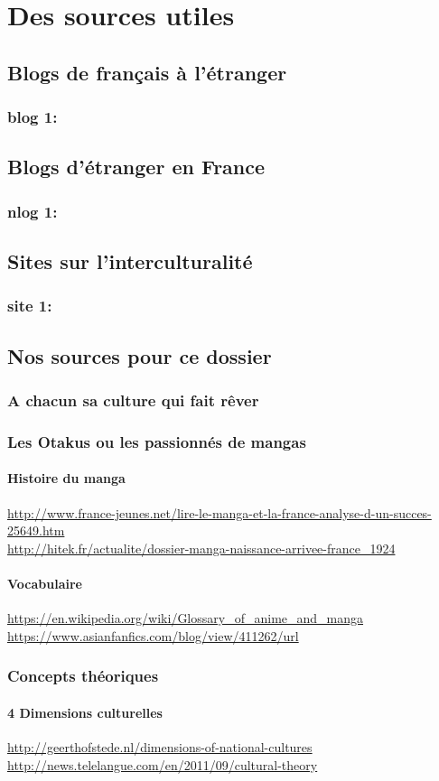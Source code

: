 \part{Des sources utiles}

\chapter{Blogs de français à l'étranger}
\section{blog 1:}


\chapter{Blogs d'étranger en France}
\section{nlog 1:}

\chapter{Sites sur l'interculturalité}
\section{site 1:}


\chapter{Nos sources pour ce dossier}
\section{A chacun sa culture qui fait rêver}
\section{Les Otakus ou les passionnés de mangas}
\subsection{Histoire du manga}
\noindent
\url{http://www.france-jeunes.net/lire-le-manga-et-la-france-analyse-d-un-succes-25649.htm}\\
\url{http://hitek.fr/actualite/dossier-manga-naissance-arrivee-france_1924}

\subsection{Vocabulaire}
\noindent
\url{https://en.wikipedia.org/wiki/Glossary_of_anime_and_manga}\\
\url{https://www.asianfanfics.com/blog/view/411262/url}

\section{Concepts théoriques}
\subsection{4 Dimensions culturelles}
\noindent
\url{http://geerthofstede.nl/dimensions-of-national-cultures}\\
\url{http://news.telelangue.com/en/2011/09/cultural-theory}
